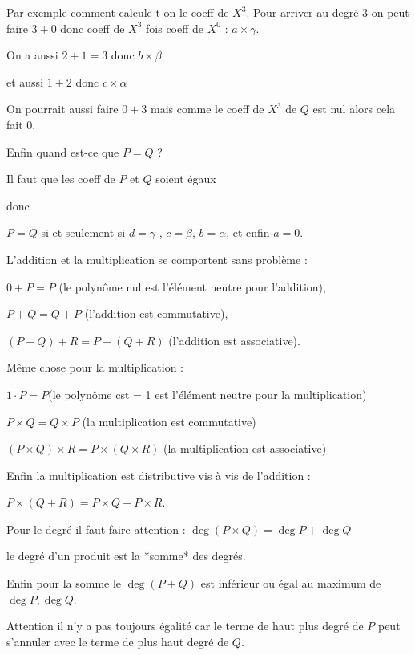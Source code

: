 Par exemple comment calcule-t-on le coeff de $X^3$.
Pour arriver au degré $3$ on peut faire
$3+0$ donc coeff de $X^3$ fois coeff de $X^0$ : $a \times \gamma$.

On a aussi $2+1=3$ donc $ b \times \beta$

et aussi $1+2$ donc $c \times \alpha$

On pourrait aussi faire $0+3$ mais comme le coeff de $X^3$ de $Q$ est nul alors cela fait $0$.


\change

Enfin quand est-ce que $P=Q$ ?

Il faut que les coeff de $P$ et $Q$ soient égaux

donc 

$P=Q$ si et seulement si $d=\gamma$ , $c=\beta$, $b=\alpha$,  et enfin $a=0$.


\diapo

L'addition et la multiplication se comportent sans problème :
 
 $0+P=P$ (le polynôme nul est l’élément neutre pour l'addition), 
 
 $P+Q=Q+P$ (l'addition est commutative),
 
 $(P+Q)+R=P+(Q+R)$ (l'addition est associative).
 
 \change
 
 Même chose pour la multiplication :
 
 $1\cdot P = P$(le polynôme cst = 1 est l’élément neutre pour la multiplication)
 
 $P\times Q=Q \times P$ (la multiplication est commutative)
 
 $(P \times Q) \times R=P \times (Q \times R)$ (la multiplication est associative)
 
 \change
 
 Enfin la multiplication est distributive vis à vis de l'addition :
 
 $P\times (Q+R)=P\times Q + P \times R$.

\change

Pour le degré il faut faire attention :
$\deg(P\times Q)=\deg P + \deg Q$

le degré d'un produit est la *somme* des degrés.


\change

Enfin pour la somme le $\deg(P+Q)$ est inférieur ou égal au maximum
de $\deg P, \deg Q$.

Attention il n'y a pas toujours égalité car le terme de haut plus degré de 
$P$ peut s'annuler avec le terme de plus haut degré de $Q$.

